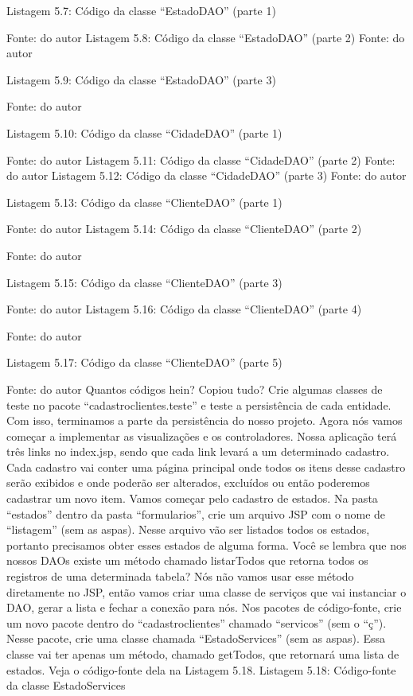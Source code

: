 Listagem 5.7: Código da classe “EstadoDAO” (parte 1)
 
Fonte: do autor
Listagem 5.8: Código da classe “EstadoDAO” (parte 2)
 Fonte: do autor






Listagem 5.9: Código da classe “EstadoDAO” (parte 3)
 
Fonte: do autor











Listagem 5.10: Código da classe “CidadeDAO” (parte 1)
 
Fonte: do autor
Listagem 5.11: Código da classe “CidadeDAO” (parte 2)
 Fonte: do autor
Listagem 5.12: Código da classe “CidadeDAO” (parte 3)
 Fonte: do autor




Listagem 5.13: Código da classe “ClienteDAO” (parte 1)
 
Fonte: do autor
Listagem 5.14: Código da classe “ClienteDAO” (parte 2)
 
Fonte: do autor


Listagem 5.15: Código da classe “ClienteDAO” (parte 3)
 
Fonte: do autor
Listagem 5.16: Código da classe “ClienteDAO” (parte 4)
 
Fonte: do autor



Listagem 5.17: Código da classe “ClienteDAO” (parte 5)
 
Fonte: do autor
Quantos códigos hein? Copiou tudo? Crie algumas classes de teste no pacote “cadastroclientes.teste” e teste a persistência de cada entidade. Com isso, terminamos a parte da persistência do nosso projeto.
Agora nós vamos começar a implementar as visualizações e os controladores. Nossa aplicação terá três links no index.jsp, sendo que cada link levará a um determinado cadastro. Cada cadastro vai conter uma página principal onde todos os itens desse cadastro serão exibidos e onde poderão ser alterados, excluídos ou então poderemos cadastrar um novo item.
Vamos começar pelo cadastro de estados. Na pasta “estados” dentro da pasta “formularios”, crie um arquivo JSP com o nome de “listagem” (sem as aspas). Nesse arquivo vão ser listados todos os estados, portanto precisamos obter esses estados de alguma forma. Você se lembra que nos nossos DAOs existe um método chamado listarTodos que retorna todos os registros de uma determinada tabela? Nós não vamos usar esse método diretamente no JSP, então vamos criar uma classe de serviços que vai instanciar o DAO, gerar a lista e fechar a conexão para nós. Nos pacotes de código-fonte, crie um novo pacote dentro do “cadastroclientes” chamado “servicos” (sem o “ç”). Nesse pacote, crie uma classe chamada “EstadoServices” (sem as aspas). Essa classe vai ter apenas um método, chamado getTodos, que retornará uma lista de estados. Veja o código-fonte dela na Listagem 5.18.
Listagem 5.18: Código-fonte da classe EstadoServices
 
